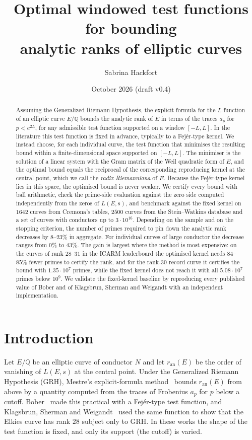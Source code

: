 \documentclass[11pt]{amsart}
\title[Optimal windowed test functions for analytic rank bounds]{Optimal windowed test functions for bounding\\ analytic ranks of elliptic curves}
\author{Sabrina Hackfort}
\date{October 2026 \quad (draft v0.4)}
\theoremstyle{remark}
\theoremstyle{definition}
\newcommand{\Q}{\mathbb{Q}}
\newcommand{\ran}{r_{\mathrm{an}}}
\begin{document}
\begin{abstract}
Assuming the Generalized Riemann Hypothesis, the explicit formula for the $L$-function of an elliptic curve $E/\Q$ bounds the analytic rank of $E$ in terms of the traces $a_p$ for $p < e^{2L}$, for any admissible test function supported on a window $[-L,L]$. In the literature this test function is fixed in advance, typically to a Fej\'er-type kernel. We instead choose, for each individual curve, the test function that minimises the resulting bound within a finite-dimensional space supported on $[-L,L]$. The minimiser is the solution of a linear system with the Gram matrix of the Weil quadratic form of $E$, and the optimal bound equals the reciprocal of the corresponding reproducing kernel at the central point, which we call the \emph{radix Riemanniana} of $E$. Because the Fej\'er-type kernel lies in this space, the optimised bound is never weaker. We certify every bound with ball arithmetic, check the prime-side evaluation against the zero side computed independently from the zeros of $L(E,s)$, and benchmark against the fixed kernel on $1642$ curves from Cremona's tables, $2500$ curves from the Stein--Watkins database and a set of curves with conductors up to $3\cdot 10^{16}$. Depending on the sample and on the stopping criterion, the number of primes required to pin down the analytic rank decreases by $8$--$23\%$ in aggregate. For individual curves of large conductor the decrease ranges from $0\%$ to $43\%$. The gain is largest where the method is most expensive: on the curves of rank $28$--$31$ in the ICARM leaderboard the optimised kernel needs $84$--$85\%$ fewer primes to certify the rank, and for the rank-$30$ record curve it certifies the bound with $1.35\cdot 10^{7}$ primes, while the fixed kernel does not reach it with all $5.08\cdot10^{7}$ primes below $10^9$. We validate the fixed-kernel baseline by reproducing every published value of Bober and of Klagsbrun, Sherman and Weigandt with an independent implementation.
\end{abstract}

\maketitle

\section{Introduction}

Let $E/\Q$ be an elliptic curve of conductor $N$ and let $\ran(E)$ be the order of vanishing of $L(E,s)$ at the central point. Under the Generalized Riemann Hypothesis (GRH), Mestre's explicit-formula method~\cite{Mestre} bounds $\ran(E)$ from above by a quantity computed from the traces of Frobenius $a_p$ for $p$ below a cutoff. Bober~\cite{Bober} made this practical with a Fej\'er-type test function, and Klagsbrun, Sherman and Weigandt~\cite{KSW} used the same function to show that the Elkies curve has rank $28$ subject only to GRH. In these works the shape of the test function is fixed, and only its support (the cutoff) is varied.
\end{document}
